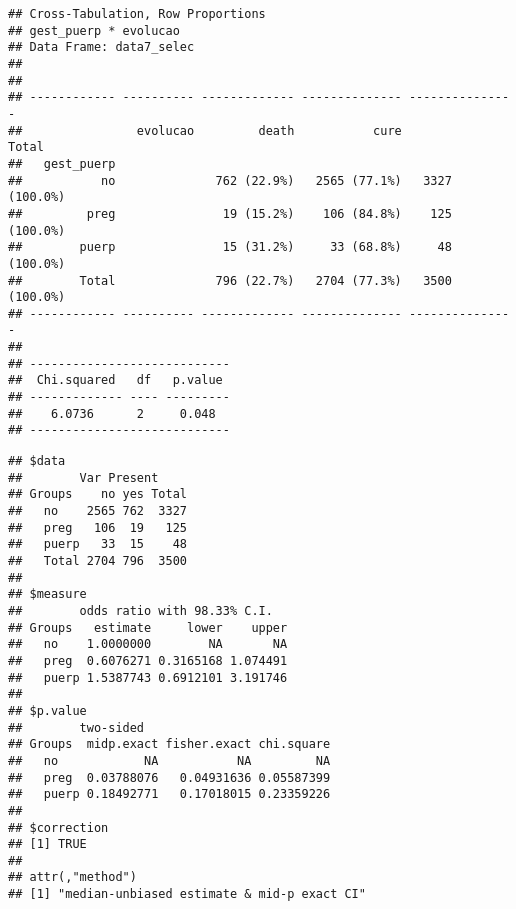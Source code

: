 \documentclass[
]{article}
\newenvironment{Shaded}{\begin{snugshade}}{\end{snugshade}}
\newcommand{\DataTypeTok}[1]{\textcolor[rgb]{0.13,0.29,0.53}{#1}}
\newcommand{\KeywordTok}[1]{\textcolor[rgb]{0.13,0.29,0.53}{\textbf{#1}}}
\newcommand{\NormalTok}[1]{#1}
\newcommand{\OperatorTok}[1]{\textcolor[rgb]{0.81,0.36,0.00}{\textbf{#1}}}
\newcommand{\OtherTok}[1]{\textcolor[rgb]{0.56,0.35,0.01}{#1}}
\newcommand{\StringTok}[1]{\textcolor[rgb]{0.31,0.60,0.02}{#1}}
\begin{document}
\begin{Shaded}
\end{Shaded}

\begin{verbatim}
## Cross-Tabulation, Row Proportions  
## gest_puerp * evolucao  
## Data Frame: data7_selec  
## 
## 
## ------------ ---------- ------------- -------------- ---------------
##                evolucao         death           cure           Total
##   gest_puerp                                                        
##           no              762 (22.9%)   2565 (77.1%)   3327 (100.0%)
##         preg               19 (15.2%)    106 (84.8%)    125 (100.0%)
##        puerp               15 (31.2%)     33 (68.8%)     48 (100.0%)
##        Total              796 (22.7%)   2704 (77.3%)   3500 (100.0%)
## ------------ ---------- ------------- -------------- ---------------
## 
## ----------------------------
##  Chi.squared   df   p.value 
## ------------- ---- ---------
##    6.0736      2     0.048  
## ----------------------------
\end{verbatim}

\begin{Shaded}
\end{Shaded}

\begin{verbatim}
## $data
##        Var Present
## Groups    no yes Total
##   no    2565 762  3327
##   preg   106  19   125
##   puerp   33  15    48
##   Total 2704 796  3500
## 
## $measure
##        odds ratio with 98.33% C.I.
## Groups   estimate     lower    upper
##   no    1.0000000        NA       NA
##   preg  0.6076271 0.3165168 1.074491
##   puerp 1.5387743 0.6912101 3.191746
## 
## $p.value
##        two-sided
## Groups  midp.exact fisher.exact chi.square
##   no            NA           NA         NA
##   preg  0.03788076   0.04931636 0.05587399
##   puerp 0.18492771   0.17018015 0.23359226
## 
## $correction
## [1] TRUE
## 
## attr(,"method")
## [1] "median-unbiased estimate & mid-p exact CI"
\end{verbatim}
\end{document}
